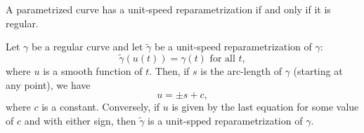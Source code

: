 \begin{proposition}
  A parametrized curve has a unit-speed reparametrization if and only if it is regular.
\end{proposition}

\begin{corollary}
  Let $\gamma$ be a regular curve and let $\tilde \gamma$ be a unit-speed reparametrization of $\gamma$:
  \[
    \tilde \gamma(u(t)) = \gamma(t) \text{ for all } t,
  \]
  where $u$ is a smooth function of $t$.
  Then, if $s$ is the arc-length of $\gamma$ (starting at any point), we have
  \[
    u = \pm s + c,
  \]
  where $c$ is a constant.
  Conversely, if $u$ is given by the last equation for some value of $c$ and with either sign,
  then $\tilde \gamma$ is a unit-spped reparametrization of $\gamma$.
\end{corollary}


